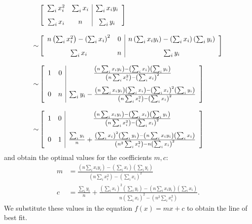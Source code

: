 \documentclass[11pt, oneside, reqno]{book}
\begin{document}
	\begin{align*}
	& \left[
	\begin{array}{c c | c}
	\sum_{i} x_i^2 & \sum_{i} x_i & \sum_{i} x_iy_i \\[8 pt]
	\sum_{i} x_i   & 	n 			  & \sum_{i} y_i 
	\end{array}
	\right] \\[8 pt]
		\sim & \left[
	\begin{array}{c c | c}
	n\left( \sum_{i} x_i^2 \right) - \left(\sum_{i} x_i\right)^2 
	& 0 
	& n\left(\sum_{i} x_iy_i\right) - \left(\sum_{i} x_i\right)\left(\sum_{i} y_i\right) \\[8 pt]
	\sum_{i} x_i & n & \sum_{i} y_i 
	\end{array}
	\right] \\[8 pt]
		\sim & \left[
	\begin{array}{c c | c}
	1 & 0 & \frac{ \left(n\sum_{i} x_iy_i\right) - \left(\sum_{i} x_i\right)\left(\sum_{i} y_i\right) }
	{ \left(n\sum_{i} x_i^2\right) - \left(\sum_{i} x_i\right)^2 } \\[13 pt]
	0 & n & \sum_{i} y_i - \frac{\left(n\sum_{i} x_iy_i\right)\left(\sum_{i} x_i\right) - \left(\sum_{i} x_i\right)^2 \left(\sum_{i} y_i\right)}
	{ \left(n\sum_{i} x_i^2\right) - \left(\sum_{i} x_i\right)^2}
	\end{array}
	\right] \\[8 pt]
		\sim & \left[
	\begin{array}{c c | c}
	1 & 0 & \frac{ \left(n\sum_{i} x_iy_i\right) - \left(\sum_{i} x_i\right)\left(\sum_{i} y_i\right) }{ \left(n\sum_{i} x_i^2\right) - \left(\sum_{i} x_i\right)^2 } \\[13 pt]
	0 & 1 & \frac{\sum_{i} y_i}{n} + \frac{\left(\sum_{i} x_i\right)^2 \left(\sum_{i} y_i\right) - \left(n\sum_{i} x_iy_i\right)\left(\sum_{i} x_i\right)}{ \left(n^2\sum_{i} x_i^2\right) - n\left(\sum_{i} x_i\right)^2 }
	\end{array}
	\right]
	\end{align*}
	and obtain the optimal values for the coefficients $m,c$: 
	\begin{align*}
	m &= \frac{ \left(n\sum_{i} x_iy_i\right) - \left(\sum_{i} x_i\right)\left(\sum_{i} y_i\right) }{ \left(n\sum_{i} x_i^2\right) - \left(\sum_{i} x_i\right)^2 }\\[6 pt]
	c &= \frac{\sum_{i} y_i}{n} + \frac{\left(\sum_{i} x_i\right)^2 \left(\sum_{i} y_i\right) - \left(n\sum_{i} x_iy_i\right)\left(\sum_{i} x_i\right)}{ n\left(\sum_{i} x_i\right)^2 - \left(n^2\sum_{i} x_i^2\right) }.
	\end{align*}
	We substitute these values in the equation $f(x) = mx + c$ to obtain the line of best fit.
	
\end{document}
